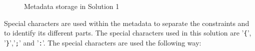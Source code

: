 		\begin{figure}[h] \label{fd:Metadata-Solution1}
			\centering
			\caption{Metadata storage in Solution 1}
		\end{figure}
Special characters are used within the metadata to separate the constraints and
to identify its different parts. The special characters used in this solution
are '\texttt{\{}', '\texttt{\}}','\texttt{;}' and '\texttt{:}'. The special
characters are used the following way:
	
